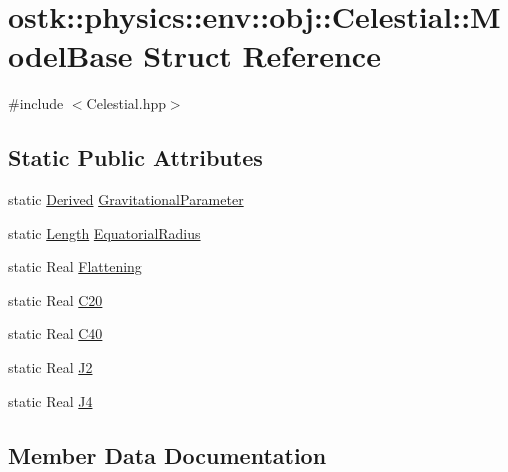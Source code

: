 \hypertarget{structostk_1_1physics_1_1env_1_1obj_1_1_celestial_1_1_model_base}{}\section{ostk\+:\+:physics\+:\+:env\+:\+:obj\+:\+:Celestial\+:\+:Model\+Base Struct Reference}
\label{structostk_1_1physics_1_1env_1_1obj_1_1_celestial_1_1_model_base}


{\ttfamily \#include $<$Celestial.\+hpp$>$}

\subsection*{Static Public Attributes}
\begin{DoxyCompactItemize}
\item 
static \hyperlink{classostk_1_1physics_1_1units_1_1_derived}{Derived} \hyperlink{structostk_1_1physics_1_1env_1_1obj_1_1_celestial_1_1_model_base_a4c56c7c4d2a9bb05f1ae77823638b900}{Gravitational\+Parameter}
\item 
static \hyperlink{classostk_1_1physics_1_1units_1_1_length}{Length} \hyperlink{structostk_1_1physics_1_1env_1_1obj_1_1_celestial_1_1_model_base_a38c0a47396e9cb47028ffbe09a464044}{Equatorial\+Radius}
\item 
static Real \hyperlink{structostk_1_1physics_1_1env_1_1obj_1_1_celestial_1_1_model_base_a6fd974f2c2691cb5c30a845a35cd346f}{Flattening}
\item 
static Real \hyperlink{structostk_1_1physics_1_1env_1_1obj_1_1_celestial_1_1_model_base_a6279947bed22b473663d3c508bd76a3e}{C20}
\item 
static Real \hyperlink{structostk_1_1physics_1_1env_1_1obj_1_1_celestial_1_1_model_base_a5f0b050edad40361843dd47b39f69f4a}{C40}
\item 
static Real \hyperlink{structostk_1_1physics_1_1env_1_1obj_1_1_celestial_1_1_model_base_a80c4de90c9b3c463dc194382fa2c028c}{J2}
\item 
static Real \hyperlink{structostk_1_1physics_1_1env_1_1obj_1_1_celestial_1_1_model_base_aafdd2f39db08c9f0a5240d3bac68ed52}{J4}
\end{DoxyCompactItemize}


\subsection{Member Data Documentation}
\mbox{\label{structostk_1_1physics_1_1env_1_1obj_1_1_celestial_1_1_model_base_a6279947bed22b473663d3c508bd76a3e}} 
